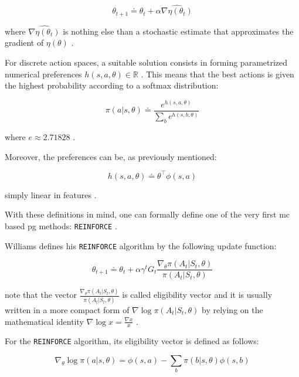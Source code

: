 \documentclass[draft=false]{seal_thesis}
\begin{document}
\begin{equation}
	\theta_{t+1} \doteq \theta_t + \alpha \widehat{\nabla \eta (\theta_t)}
\end{equation}

where $ \widehat{\nabla \eta (\theta_t)}$ is nothing else than a stochastic estimate that approximates the gradient of $\eta(\theta)$ \citep[p. 265]{Sutton2017}.

For discrete action spaces, a suitable solution consists in forming parametrized numerical preferences $h(s,a,\theta) \in \mathbb{R}$ \citep[p. 266]{Sutton2017}. This means that the best actions is given the highest probability according to a softmax distribution:

\begin{equation}
\label{eq:probabilistic_preferences}
	\pi(a|s,\theta) \doteq \frac{e^{h(s,a,\theta)}}{\sum_b e^{h(s,b,\theta)}}
\end{equation}

where $e \approx 2.71828$ \citep[p. 266]{Sutton2017}.

Moreover, the preferences can be, as previously mentioned:

\begin{equation}
\label{eq:dot_preferences}
	h(s,a,\theta) \doteq \theta^\top \phi (s,a)
\end{equation}

\ie simply linear in features \citep[p. 266]{Sutton2017}.

With these definitions in mind, one can formally define one of the very first \gls{mc} based \gls{pg} methods: \texttt{REINFORCE} \citep{Williams1992}.

Williams defines his \texttt{REINFORCE} algorithm by the following update function:

\begin{equation}
	\theta_{t+1} \doteq \theta_t + \alpha \gamma^t G_t \frac{\nabla_\theta \pi(A_t|S_t,\theta)}{\pi(A_t|S_t,\theta)}
\end{equation}

note that the vector $\frac{\nabla_\theta \pi(A_t|S_t,\theta)}{\pi(A_t|S_t,\theta)}$ is called eligibility vector and it is usually written in a more compact form of $\nabla \log \pi(A_t|S_t,\theta)$ by relying on the mathematical identity $\nabla \log x = \frac{\nabla x}{x}$ \citep[p. 271]{Sutton2017}.

For the \texttt{REINFORCE} algorithm, its eligibility vector is defined as follows:

\begin{equation}
	\nabla_\theta \log \pi (a|s,\theta) = \phi (s,a) - \sum_b \pi (b|s,\theta) \phi (s,b)
\end{equation}
\end{document}
